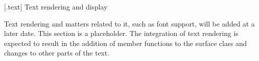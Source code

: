 
 [\iotwod.text] {Text rendering and display}

\pnum
\begin{note}
Text rendering and matters related to it, such as font support, will be added at a later date. This section is a placeholder. The integration of text rendering is expected to result in the addition of member functions to the surface class and changes to other parts of the text.
\end{note}
